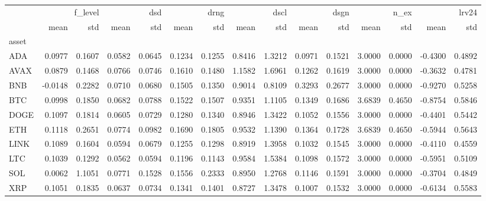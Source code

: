 \begin{tabular}{lrrrrrrrrrrrrrr}
\toprule
 & \multicolumn{2}{r}{f_level} & \multicolumn{2}{r}{dsd} & \multicolumn{2}{r}{drng} & \multicolumn{2}{r}{dscl} & \multicolumn{2}{r}{dsgn} & \multicolumn{2}{r}{n_ex} & \multicolumn{2}{r}{lrv24} \\
 & mean & std & mean & std & mean & std & mean & std & mean & std & mean & std & mean & std \\
asset &  &  &  &  &  &  &  &  &  &  &  &  &  &  \\
\midrule
ADA & 0.0977 & 0.1607 & 0.0582 & 0.0645 & 0.1234 & 0.1255 & 0.8416 & 1.3212 & 0.0971 & 0.1521 & 3.0000 & 0.0000 & -0.4300 & 0.4892 \\
AVAX & 0.0879 & 0.1468 & 0.0766 & 0.0746 & 0.1610 & 0.1480 & 1.1582 & 1.6961 & 0.1262 & 0.1619 & 3.0000 & 0.0000 & -0.3632 & 0.4781 \\
BNB & -0.0148 & 0.2282 & 0.0710 & 0.0680 & 0.1505 & 0.1350 & 0.9014 & 0.8109 & 0.3293 & 0.2677 & 3.0000 & 0.0000 & -0.9270 & 0.5258 \\
BTC & 0.0998 & 0.1850 & 0.0682 & 0.0788 & 0.1522 & 0.1507 & 0.9351 & 1.1105 & 0.1349 & 0.1686 & 3.6839 & 0.4650 & -0.8754 & 0.5846 \\
DOGE & 0.1097 & 0.1814 & 0.0605 & 0.0729 & 0.1280 & 0.1340 & 0.8946 & 1.3422 & 0.1052 & 0.1556 & 3.0000 & 0.0000 & -0.4401 & 0.5442 \\
ETH & 0.1118 & 0.2651 & 0.0774 & 0.0982 & 0.1690 & 0.1805 & 0.9532 & 1.1390 & 0.1364 & 0.1728 & 3.6839 & 0.4650 & -0.5944 & 0.5643 \\
LINK & 0.1089 & 0.1604 & 0.0594 & 0.0679 & 0.1255 & 0.1298 & 0.8919 & 1.3958 & 0.1032 & 0.1545 & 3.0000 & 0.0000 & -0.4110 & 0.4559 \\
LTC & 0.1039 & 0.1292 & 0.0562 & 0.0594 & 0.1196 & 0.1143 & 0.9584 & 1.5384 & 0.1098 & 0.1572 & 3.0000 & 0.0000 & -0.5951 & 0.5109 \\
SOL & 0.0062 & 1.1051 & 0.0771 & 0.1528 & 0.1556 & 0.2333 & 0.8950 & 1.2768 & 0.1146 & 0.1591 & 3.0000 & 0.0000 & -0.3704 & 0.4849 \\
XRP & 0.1051 & 0.1835 & 0.0637 & 0.0734 & 0.1341 & 0.1401 & 0.8727 & 1.3478 & 0.1007 & 0.1532 & 3.0000 & 0.0000 & -0.6134 & 0.5583 \\
\bottomrule
\end{tabular}
